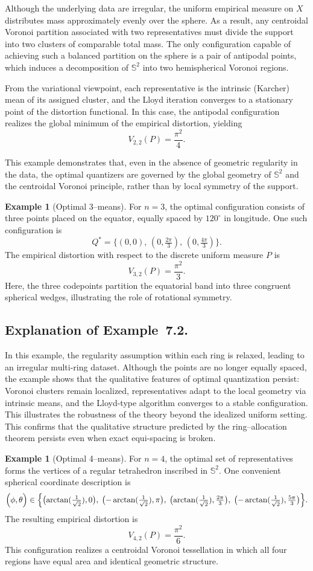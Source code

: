 \documentclass[12pt, reqno]{amsart}
\theoremstyle{plain}
\theoremstyle{definition}
\newtheorem{exam}[subsection]{Example}
\newcommand{\D}[1]{\mathbb{#1}}%
\begin{document}
Although the underlying data are irregular, the uniform empirical measure
on \(X\) distributes mass approximately evenly over the sphere.
As a result, any centroidal Voronoi partition associated with two representatives
must divide the support into two clusters of comparable total mass.
The only configuration capable of achieving such a balanced partition
on the sphere is a pair of antipodal points, which induces a decomposition
of \(\D S^2\) into two hemispherical Voronoi regions.

From the variational viewpoint, each representative is the intrinsic (Karcher)
mean of its assigned cluster, and the Lloyd iteration converges to a stationary
point of the distortion functional.
In this case, the antipodal configuration realizes the global minimum of the
empirical distortion, yielding
\[
V_{2,2}(P) = \frac{\pi^2}{4}.
\]

This example demonstrates that, even in the absence of geometric regularity
in the data, the optimal quantizers are governed by the global geometry of
\(\D S^2\) and the centroidal Voronoi principle, rather than by local symmetry
of the support.
\begin{exam}[Optimal 3--means]\label{ex:3means}
For $n=3$, the optimal configuration consists of three points placed on the equator, equally spaced by $120^\circ$ in longitude. One such configuration is
\[
Q^*=\bigl\{(0,0),\,(0,\tfrac{2\pi}{3}),\,(0,\tfrac{4\pi}{3})\bigr\}.
\]
The empirical distortion with respect to the discrete uniform measure $P$ is
\[
V_{3,2}(P)=\frac{\pi^2}{3}.
\]
Here, the three codepoints partition the equatorial band into three congruent spherical wedges, illustrating the role of rotational symmetry.
\end{exam}
\subsection*{Explanation of Example~7.2.}
In this example, the regularity assumption within each ring is relaxed, leading
to an irregular multi-ring dataset. Although the points are no longer equally
spaced, the example shows that the qualitative features of optimal quantization
persist: Voronoi clusters remain localized, representatives adapt to the local
geometry via intrinsic means, and the Lloyd-type algorithm converges to a stable
configuration. This illustrates the robustness of the theory beyond the idealized
uniform setting. This confirms that the qualitative structure predicted by the ring–allocation theorem persists even when exact equi-spacing is broken.
\begin{exam}[Optimal 4--means]\label{ex:4means}
For $n=4$, the optimal set of representatives forms the vertices of a regular tetrahedron inscribed in $\mathbb{S}^2$. One convenient spherical coordinate description is
\[
\Bigl(\phi,\theta\Bigr)\in
\Bigl\{\bigl(\arctan(\tfrac{1}{\sqrt{2}}),0\bigr),\;
\bigl(-\arctan(\tfrac{1}{\sqrt{2}}),\pi\bigr),\;
\bigl(\arctan(\tfrac{1}{\sqrt{2}}),\tfrac{2\pi}{3}\bigr),\;
\bigl(-\arctan(\tfrac{1}{\sqrt{2}}),\tfrac{5\pi}{3}\bigr)\Bigr\}.
\]
The resulting empirical distortion is
\[
V_{4,2}(P)=\frac{\pi^2}{6}.
\]
This configuration realizes a centroidal Voronoi tessellation in which all four regions have equal area and identical geometric structure.
\end{exam}
\end{document}
